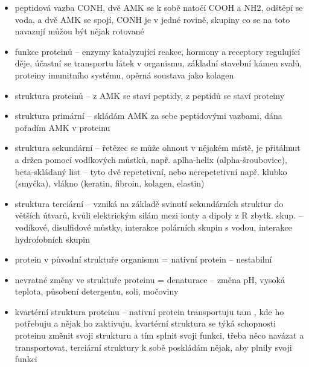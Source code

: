 \documentclass{article}
\begin{document}
\begin{itemize}
  \item peptidová vazba CONH, dvě AMK se k sobě natočí COOH a NH2, odštěpí se voda, a dvě AMK se spojí, CONH je v jedné rovině, skupiny co se na toto navazují můžou být nějak rotované
  \item funkce proteinů -- enzymy katalyzující reakce, hormony a receptory regulující děje, účastní se transportu látek v organismu, základní stavební kámen svalů, proteiny imunitního systému, opěrná soustava jako kolagen
  \item struktura proteinů -- z AMK se staví peptidy, z peptidů se staví proteiny
  \item struktura primární -- skládám AMK za sebe peptidovými vazbami, dána pořadím AMK v proteinu
  \item struktura sekundární -- řetězec se může ohnout v nějakém místě, je přitáhnut a držen pomocí vodíkových můstků, např. aplha-helix (alpha-šroubovice), beta-skládaný list -- tyto dvě repetetivní, nebo nerepetetivní např. klubko (smyčka), vlákno (keratin, fibroin, kolagen, elastin)
  \item struktura terciární -- vzniká na základě svinutí sekundárních struktur do větších útvarů, kvůli elektrickým silám mezi ionty a dipoly z R zbytk. skup. -- vodíkové, disulfidové můstky, interakce polárních skupin s vodou, interakce hydrofobních skupin
  \item protein v původní struktuře organismu = nativní protein -- nestabilní
  \item nevratné změny ve struktuře proteinu = denaturace -- změna pH, vysoká teplota, působení detergentu, soli, močoviny
  \item kvartérní struktura proteinu -- nativní protein transportuju tam , kde ho potřebuju a nějak ho zaktivuju, kvartérní struktura se týká schopnosti proteinu změnit svoji strukturu a tím splnit svoji funkci, třeba něco navázat a transportovat, terciární struktury k sobě poskládám nějak, aby plnily svoji funkci
\end{itemize}
\end{document}
